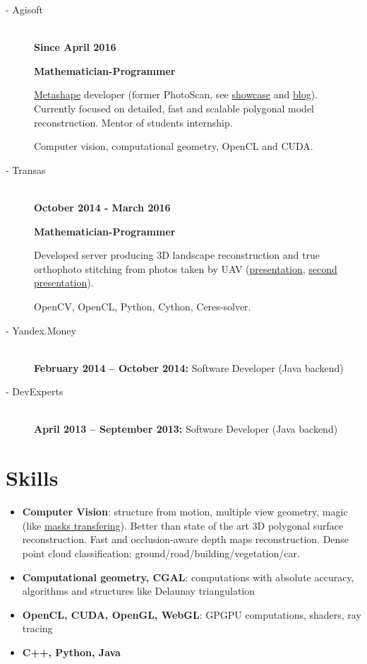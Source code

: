 \documentclass[11pt,oneside]{article}
\newcommand{\hhref}[2]{\href{#1}{\color{blue}#2}}
\begin{document}
\begin{description}
  \item[ - Agisoft] \hfill \\
    \textbf{Since April 2016}

    \textbf{Mathematician-Programmer}

    \hhref{https://en.wikipedia.org/wiki/PhotoScan}{Metashape} developer (former PhotoScan, see \hhref{http://www.agisoft.com/community/showcase/}{showcase} and \hhref{http://www.agisoft.com/community/blog/}{blog}).
    Currently focused on detailed, fast and scalable polygonal model reconstruction.
    Mentor of students internship.

    Computer vision, computational geometry, OpenCL and CUDA.
  \item[ - Transas] \hfill \\
    \textbf{October 2014 - March 2016}

    \textbf{Mathematician-Programmer}

    Developed server producing 3D landscape reconstruction and true orthophoto stitching from photos taken by UAV (\hhref{http://polarnick239.github.io/old/cv/Monoceros1.pdf}{presentation}, \hhref{http://polarnick239.github.io/old/cv/Monoceros2.pdf}{second presentation}).

    OpenCV, OpenCL, Python, Cython, Ceres-solver.
  \item[ - Yandex.Money] \hfill \\
    \textbf{February 2014 – October 2014:} Software Developer (Java backend)
  \item[ - DevExperts] \hfill \\
    \textbf{April 2013 – September 2013:} Software Developer (Java backend)

\end{description}


\vspace{-9pt}
\section*{\textbf{Skills}}
\vspace{-9pt}

\begin{itemize}
    \item{\textbf{Computer Vision}}: structure from motion, multiple view geometry, magic (like  \hhref{http://www.agisoft.com/index.php?id=49}{masks transfering}).
    Better than state of the art 3D polygonal surface reconstruction.
    Fast and occlusion-aware depth maps reconstruction.
    Dense point cloud classification: ground/road/building/vegetation/car.

    \item{\textbf{Computational geometry, CGAL}}: computations with absolute accuracy, algorithms and structures like Delaunay triangulation

    \item{\textbf{OpenCL, CUDA, OpenGL, WebGL}}: GPGPU computations, shaders, ray tracing

    \item{\textbf{C++, Python, Java}}
\end{itemize}
\end{document}
